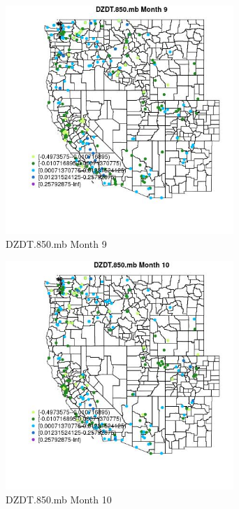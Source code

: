 \begin{figure} 
\centering  
\includegraphics[width=0.77\textwidth]{Code_Outputs/Report_ML_input_PM25_Step4_part_e_de_duplicated_aveswNAs_MapObsMo9DZDT850mb.jpg} 
\caption{\label{fig:Report_ML_input_PM25_Step4_part_e_de_duplicated_aveswNAsMapObsMo9DZDT850mb}DZDT.850.mb Month 9} 
\end{figure} 
 

\begin{figure} 
\centering  
\includegraphics[width=0.77\textwidth]{Code_Outputs/Report_ML_input_PM25_Step4_part_e_de_duplicated_aveswNAs_MapObsMo10DZDT850mb.jpg} 
\caption{\label{fig:Report_ML_input_PM25_Step4_part_e_de_duplicated_aveswNAsMapObsMo10DZDT850mb}DZDT.850.mb Month 10} 
\end{figure} 
 

